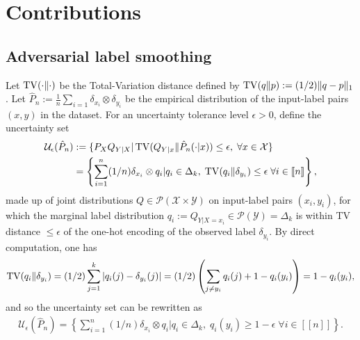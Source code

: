 \section{Contributions}
\subsection{Adversarial label smoothing}
Let $\operatorname{TV}(\cdot\|\cdot)$ be the Total-Variation distance  defined by $\operatorname{TV}(q\|p)
:= (1/2)\|q-p\|_1$. Let $\hat{P}_n := \frac{1}{n}\sum_{i=1}\delta_{x_i} \otimes
\delta_{y_i}$ be the empirical distribution of the input-label pairs $(x,y)$ in
the dataset. For an uncertainty tolerance level $\epsilon>0$, define the
uncertainty set
\begin{eqnarray}
  \begin{split}
    \mathcal U_\epsilon(\hat{P}_n) &:= \{P_XQ_{Y|X} |
  \operatorname{TV}(Q_{Y|x}\|\hat{P}_n(\cdot|x)) \le \epsilon,\;\forall x \in \mathcal X\}\\
  &=\left\{\sum_{i=1}^n(1/n)\delta_{x_i} \otimes q_i | q_i \in \Delta_k,\;
    \operatorname{TV}(q_i\|\delta_{y_i})\le \epsilon\;\forall i \in [\![n]\!]\right\},
  \end{split}
\end{eqnarray}
made up of joint distributions $Q \in \mathcal P(\mathcal X \times \mathcal Y)$
on input-label pairs $(x_i,y_i)$, for which the marginal label distribution
$q_i:=Q_{Y|X=x_i} \in \mathcal P(\mathcal Y)=\Delta_k$ is within  TV distance
$\le \epsilon$ of the one-hot encoding of the observed label $\delta_{y_i}$. By
direct computation, one has
$$
\operatorname{TV}(q_i\|\delta_{y_i}) = (1/2)\sum_{j=1}^k|q_i(j)-\delta_{y_i}(j)| = (1/2)
\left(\sum_{j \ne y_i}q_i(j) + 1 - q_i(y_i)\right)=1-q_i(y_i),
$$
and so the uncertainty set can be rewritten as
\begin{eqnarray}
  \mathcal U_\epsilon(\hat{P}_n)=\left\{\sum_{i=1}^n(1/n)\delta_{x_i} \otimes q_i | q_i \in
  \Delta_k,\;q_i(y_i)\ge 1 - \epsilon\;\forall i \in [\![n]\!]\right\}.
\end{eqnarray}



